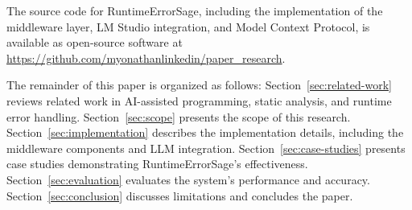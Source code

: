 The source code for RuntimeErrorSage, including the implementation of the middleware layer, LM Studio integration, and Model Context Protocol, is available as open-source software at \url{https://github.com/myonathanlinkedin/paper_research}.

The remainder of this paper is organized as follows: Section~\ref{sec:related-work} reviews related work in AI-assisted programming, static analysis, and runtime error handling. Section~\ref{sec:scope} presents the scope of this research. Section~\ref{sec:implementation} describes the implementation details, including the middleware components and LLM integration. Section~\ref{sec:case-studies} presents case studies demonstrating RuntimeErrorSage's effectiveness. Section~\ref{sec:evaluation} evaluates the system's performance and accuracy. Section~\ref{sec:conclusion} discusses limitations and concludes the paper.